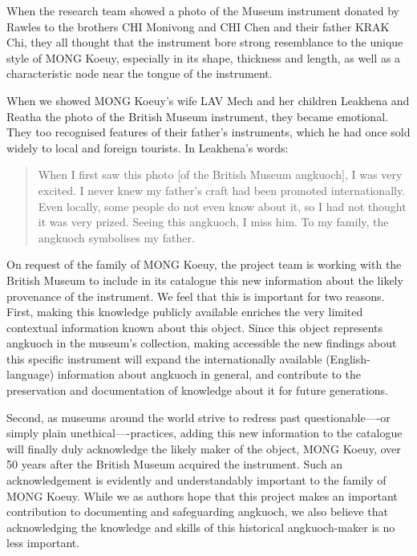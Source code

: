 \documentclass[twoside]{article}
\begin{document}
When the research team showed a photo of the Museum instrument donated
by Rawles to the brothers CHI Monivong and CHI Chen and their father
KRAK Chi, they all thought that the instrument bore strong resemblance
to the unique style of MONG Koeuy, especially in its shape, thickness
and length, as well as a characteristic node near the tongue of the
instrument.

When we showed MONG Koeuy's wife LAV Mech and her children Leakhena and
Reatha the photo of the British Museum instrument, they became
emotional. They too recognised features of their father's instruments,
which he had once sold widely to local and foreign tourists. In
Leakhena's words:

\begin{quote}
When I first saw this photo {[}of the British Museum angkuoch{]}, I was
very excited. I never knew my father's craft had been promoted
internationally. Even locally, some people do not even know about it, so
I had not thought it was very prized. Seeing this angkuoch, I miss him.
To my family, the angkuoch symbolises my father.
\end{quote}

On request of the family of MONG Koeuy, the project team is working with
the British Museum to include in its catalogue this new information
about the likely provenance of the instrument. We feel that this is
important for two reasons. First, making this knowledge publicly
available enriches the very limited contextual information known about
this object. Since this object represents angkuoch in the museum's
collection, making accessible the new findings about this specific
instrument will expand the internationally available (English-language)
information about angkuoch in general, and contribute to the
preservation and documentation of knowledge about it for future
generations.

Second, as museums around the world strive to redress past
questionable----or simply plain unethical----practices, adding this new
information to the catalogue will finally duly acknowledge the likely
maker of the object, MONG Koeuy, over 50 years after the British Museum
acquired the instrument. Such an acknowledgement is evidently and
understandably important to the family of MONG Koeuy. While we as
authors hope that this project makes an important contribution to
documenting and safeguarding angkuoch, we also believe that
acknowledging the knowledge and skills of this historical angkuoch-maker
is no less important.
\end{document}

